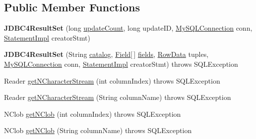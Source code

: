 \subsection*{Public Member Functions}
\begin{DoxyCompactItemize}
\item 
\mbox{\label{classcom_1_1mysql_1_1jdbc_1_1_j_d_b_c4_result_set_a70b5d683429f0ea686963f736d666974}} 
{\bfseries J\+D\+B\+C4\+Result\+Set} (long \mbox{\hyperlink{classcom_1_1mysql_1_1jdbc_1_1_result_set_impl_a3278756f102c97b9e4f5e5aa53590722}{update\+Count}}, long update\+ID, \mbox{\hyperlink{interfacecom_1_1mysql_1_1jdbc_1_1_my_s_q_l_connection}{My\+S\+Q\+L\+Connection}} conn, \mbox{\hyperlink{classcom_1_1mysql_1_1jdbc_1_1_statement_impl}{Statement\+Impl}} creator\+Stmt)
\item 
\mbox{\label{classcom_1_1mysql_1_1jdbc_1_1_j_d_b_c4_result_set_a1cb8ecbd072c4b0241014cf27b7b7df6}} 
{\bfseries J\+D\+B\+C4\+Result\+Set} (String \mbox{\hyperlink{classcom_1_1mysql_1_1jdbc_1_1_result_set_impl_ae05d8a0ad69c96645b783537100fb95c}{catalog}}, \mbox{\hyperlink{classcom_1_1mysql_1_1jdbc_1_1_field}{Field}}\mbox{[}$\,$\mbox{]} \mbox{\hyperlink{classcom_1_1mysql_1_1jdbc_1_1_result_set_impl_a5da5c6ef8d035aa65884115a2f7daf67}{fields}}, \mbox{\hyperlink{interfacecom_1_1mysql_1_1jdbc_1_1_row_data}{Row\+Data}} tuples, \mbox{\hyperlink{interfacecom_1_1mysql_1_1jdbc_1_1_my_s_q_l_connection}{My\+S\+Q\+L\+Connection}} conn, \mbox{\hyperlink{classcom_1_1mysql_1_1jdbc_1_1_statement_impl}{Statement\+Impl}} creator\+Stmt)  throws S\+Q\+L\+Exception 
\item 
Reader \mbox{\hyperlink{classcom_1_1mysql_1_1jdbc_1_1_j_d_b_c4_result_set_a2581614c5be14cbcdd5e776e4bc7bc52}{get\+N\+Character\+Stream}} (int column\+Index)  throws S\+Q\+L\+Exception 
\item 
Reader \mbox{\hyperlink{classcom_1_1mysql_1_1jdbc_1_1_j_d_b_c4_result_set_a4477f8b894dc7e0892bb80064db7f499}{get\+N\+Character\+Stream}} (String column\+Name)  throws S\+Q\+L\+Exception 
\item 
N\+Clob \mbox{\hyperlink{classcom_1_1mysql_1_1jdbc_1_1_j_d_b_c4_result_set_af604405c61bde640ee0b00aba57b81e1}{get\+N\+Clob}} (int column\+Index)  throws S\+Q\+L\+Exception 
\item 
N\+Clob \mbox{\hyperlink{classcom_1_1mysql_1_1jdbc_1_1_j_d_b_c4_result_set_ab31ba6018cd42a3af784126f0d17db83}{get\+N\+Clob}} (String column\+Name)  throws S\+Q\+L\+Exception 

\end{DoxyCompactItemize}

